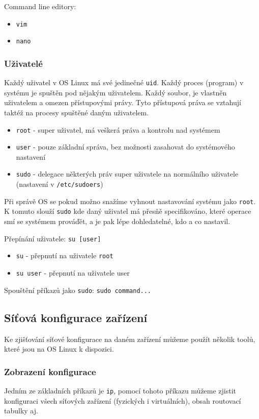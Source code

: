 Command line editory:
\begin{itemize}
				\item \texttt{vim}
				\item \texttt{nano}
\end{itemize}

\subsubsection{Uživatelé}
Každý uživatel v OS Linux má své jedinečné \texttt{uid}. Každý proces (program)
v systému je spuštěn pod nějakým uživatelem. Každý soubor, je vlastněn uživatelem
a omezen přístupovými právy. Tyto přístupová práva se vztahují taktéž na procesy
spuštěné daným uživatelem.

\begin{itemize}
				\item \texttt{root} - super uživatel, má veškerá práva a kontrolu nad systémem
				\item \texttt{user} - pouze základní správa, bez možnosti zasahovat do systémového nastavení
				\item \texttt{sudo} - delegace některých práv super uživatele na normálního uživatele (nastavení v \texttt{/etc/sudoers})
\end{itemize}

Při správě OS se pokud možno snažíme vyhnout nastavování systému jako \texttt{root}. K tomuto slouží \texttt{sudo}
kde daný uživatel má přesňě specifikováno, které operace smí se systémem prováďět, a je pak lépe dohledatelné,
kdo a co nastavil.

Přepínání uživatele:
\texttt{su [user]}
\begin{itemize}
				\item \texttt{su} - přepnutí na uživatele \texttt{root}
				\item \texttt{su user} - přepnutí na uživatele user
\end{itemize}

Spouštění příkazů jako \texttt{sudo}:
\texttt{sudo command...}


\subsection{Síťová konfigurace zařízení}
Ke zjišťování síťové konfigurace na daném zařízení můžeme použít několik toolů,
které jsou na OS Linux k dispozici.

\subsubsection{Zobrazení konfigurace}
Jedním ze základních příkazů je \texttt{ip}, pomocí tohoto příkazu můžeme zjistit
konfiguraci všech síťových zařízení (fyzických i virtuálních), obsah routovací tabulky aj.

